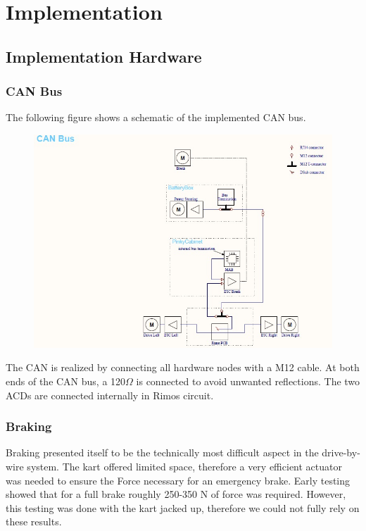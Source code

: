 
\chapter{Implementation}
\label{chp:Implementation}

\section{Implementation Hardware}

\subsection{CAN Bus}

The following figure shows a schematic of the implemented CAN bus.
\begin{figure}[h]
	\centering
	\includegraphics[width=0.7\linewidth]{pictures_figures/Used/Picture_CANbus}
	\caption{}
	\label{CAN bus}
\end{figure}

The CAN is realized by connecting all hardware nodes with a M12 cable. At both ends of the CAN bus, a 120$\Omega$ is connected to avoid unwanted reflections. The two ACDs are connected internally in Rimos circuit.


\subsection{Braking}

Braking presented itself to be the technically most difficult aspect in the drive-by-wire system. The kart offered limited space, therefore a very efficient actuator was needed to ensure the Force necessary for an emergency brake. Early testing showed that for a full brake roughly 250-350 N of force was required. However, this testing was done with the kart jacked up, therefore we could not fully rely on these results.

